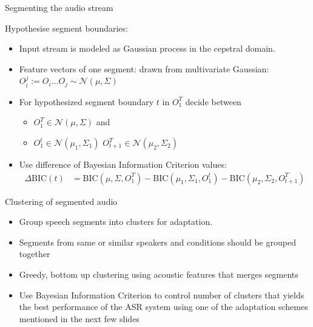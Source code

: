 \begin{frame}{Segmenting the audio stream}
  
 Hypothesise segment boundaries:
 
\begin{itemize}
  \item  Input stream is modeled as Gaussian process in the cepstral domain.
  \item Feature vectors of one segment: drawn from multivariate Gaussian: $O_i^j := O_i \ldots O_j \sim \mathcal{N}(\mu, \Sigma)$ 

  \item For hypothesized segment boundary $t$ in $O_1^T$ decide between
    \begin{itemize}
 
    \item $O_1^T \in \mathcal{N}(\mu, \Sigma)$ and

    \item  $O_1^t \in \mathcal{N}(\mu_1, \Sigma_1)$ $O_{t+1}^T \in \mathcal{N}(\mu_2, \Sigma_2)$
    \end{itemize}
  \item Use difference of Bayesian Information Criterion values:
  \begin{align*}
    \Delta \mathrm{BIC}(t) &= \mathrm{BIC}(\mu, \Sigma, O_1^T) - \mathrm{BIC}(\mu_1, \Sigma_1, O_1^t) - \mathrm{BIC}(\mu_2, \Sigma_2, O_{t+1}^T) 
  \end{align*}
\end{itemize}

\end{frame}

\begin{frame}{Clustering of segmented audio}
\begin{itemize}
  \item  Group speech segments into clusters for adaptation.
  \item  Segments from same or similar speakers and conditions should be grouped together
   \item Greedy, bottom up clustering using acoustic features that merges segments
   \item Use Bayesian Information Criterion to control number of clusters that yields the best performance of the ASR system using one of the adaptation schemes mentioned in the next few slides
\end{itemize}

\end{frame}

